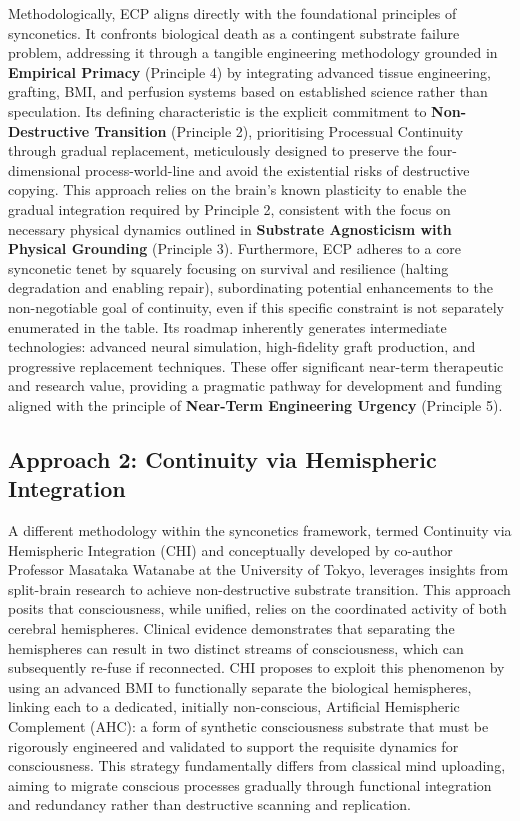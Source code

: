 \documentclass[10pt]{article}
\begin{document}
\begin{sloppypar}
  Methodologically, ECP aligns directly with the foundational principles of synconetics. It confronts biological death as a contingent substrate failure problem, addressing it through a tangible engineering methodology grounded in \textbf{Empirical Primacy} (Principle 4) by integrating advanced tissue engineering, grafting, BMI, and perfusion systems based on established science rather than speculation. Its defining characteristic is the explicit commitment to \textbf{Non-Destructive Transition} (Principle 2), prioritising Processual Continuity through gradual replacement, meticulously designed to preserve the four-dimensional process-world-line and avoid the existential risks of destructive copying. This approach relies on the brain’s known plasticity to enable the gradual integration required by Principle 2, consistent with the focus on necessary physical dynamics outlined in \textbf{Substrate Agnosticism with Physical Grounding} (Principle 3). Furthermore, ECP adheres to a core synconetic tenet by squarely focusing on survival and resilience (halting degradation and enabling repair), subordinating potential enhancements to the non-negotiable goal of continuity, even if this specific constraint is not separately enumerated in the table. Its roadmap inherently generates intermediate technologies: advanced neural simulation, high-fidelity graft production, and progressive replacement techniques. These offer significant near-term therapeutic and research value, providing a pragmatic pathway for development and funding aligned with the principle of \textbf{Near-Term Engineering Urgency} (Principle 5).

  \subsection{Approach 2: Continuity via Hemispheric Integration}
  \label{sec:chi}

  A different methodology within the synconetics framework, termed Continuity via Hemispheric Integration (CHI) and conceptually developed by co-author Professor Masataka Watanabe at the University of Tokyo, leverages insights from split-brain research to achieve non-destructive substrate transition. This approach posits that consciousness, while unified, relies on the coordinated activity of both cerebral hemispheres. Clinical evidence demonstrates that separating the hemispheres can result in two distinct streams of consciousness, which can subsequently re-fuse if reconnected. CHI proposes to exploit this phenomenon by using an advanced BMI to functionally separate the biological hemispheres, linking each to a dedicated, initially non-conscious, Artificial Hemispheric Complement (AHC): a form of synthetic consciousness substrate that must be rigorously engineered and validated to support the requisite dynamics for consciousness. This strategy fundamentally differs from classical mind uploading, aiming to migrate conscious processes gradually through functional integration and redundancy rather than destructive scanning and replication.


\end{sloppypar}
\end{document}
